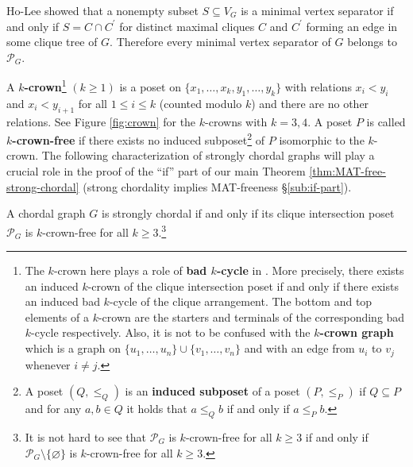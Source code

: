 \documentclass[ALCO, Unicode,published]{cedram}
\begin{document}
\begin{remark}\label{Ho and Lee}
Ho-Lee \cite[Lemma 2.1]{ho1989counting-ipl} showed that a nonempty subset $ S \subseteq V_{G} $ is a minimal vertex separator if and only if $ S = C \cap C^{\prime} $ for distinct maximal cliques $ C $ and $ C^{\prime} $ forming an edge in some clique tree of $G$.
Therefore every minimal vertex separator of $ G $ belongs to $ \mathcal{P}_{G} $. 
\end{remark}

A \textbf{$ k $-crown}\footnote{The $ k $-crown here plays a role of \textbf{bad $ k $-cycle} in  \cite{nevries2015characterizing-dam}. 
More precisely, there exists an induced $k$-crown of the clique intersection poset if and only if there exists an induced bad $k$-cycle of the clique arrangement. The bottom and top elements of a $k$-crown are  the starters and terminals of the corresponding bad $k$-cycle respectively. Also, it is not to be confused with the \textbf{$k$-crown graph} which is a graph on $\{u_{1}, \dots, u_{n}\} \cup \{v_{1}, \dots, v_{n}\}$ and with an edge from $u_i$ to $v_j$ whenever $i\ne j$.}
$(k\ge1)$
 is a poset on $ \{x_{1}, \dots, x_{k}, y_{1}, \dots, y_{k}\} $ with relations $ x_{i} < y_{i} $ and $ x_{i} < y_{i+1} $ for all $1 \le  i \le k$ (counted modulo $k$) and there are no other relations. 
 See Figure \ref{fig:crown} for the $k$-crowns with $k=3,4$.
A poset $ P $ is called \textbf{$ k $-crown-free} if there exists no induced subposet\footnote{A poset $(Q,\le_Q)$ is an \textbf{induced subposet} of a poset $(P,\le_P)$ if $Q\subseteq P$ and for any $a,b \in Q$ it holds that $a \le_Q b$ if and only if $a \le_P b.$} of $ P $ isomorphic to the $ k $-crown.  
The following characterization of strongly chordal graphs will play a crucial role in the proof of the ``if'' part of our main Theorem \ref{thm:MAT-free-strong-chordal} (strong chordality implies MAT-freeness \S\ref{sub:if-part}).
\begin{theorem}\label{Nevries-Rosenke}
A chordal graph $ G $ is strongly chordal if and only if its clique intersection poset $ \mathcal{P}_{G} $ is $ k $-crown-free for all $ k \geq 3 $.\footnote{It is not hard to see that  $ \mathcal{P}_{G} $ is $ k $-crown-free for all $ k \geq 3 $ if and only if $ \mathcal{P}_{G}  \setminus \{\varnothing\}$  is $ k $-crown-free for all $ k \geq 3 $.}
\end{theorem}
\end{document}
